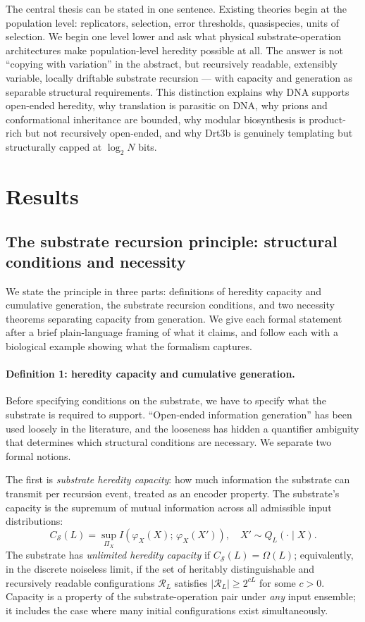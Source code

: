 \documentclass[aps,prx,reprint,amsmath,amssymb,floatfix,superscriptaddress,nofootinbib]{revtex4-2}
\theoremstyle{plain-thm}
\theoremstyle{definition-thm}
\newcommand{\Csub}{C_{\mathcal{S}}}
\newcommand{\descX}{\varphi_X}
\newcommand{\Reach}{\mathcal{R}}
\begin{document}
The central thesis can be stated in one sentence. Existing theories begin at the population level: replicators, selection, error thresholds, quasispecies, units of selection. We begin one level lower and ask what physical substrate-operation architectures make population-level heredity possible at all. The answer is not ``copying with variation'' in the abstract, but recursively readable, extensibly variable, locally driftable substrate recursion --- with capacity and generation as separable structural requirements. This distinction explains why DNA supports open-ended heredity, why translation is parasitic on DNA, why prions and conformational inheritance are bounded, why modular biosynthesis is product-rich but not recursively open-ended, and why Drt3b is genuinely templating but structurally capped at $\log_2 N$ bits.


\section{Results}

\subsection{The substrate recursion principle: structural conditions and necessity}

We state the principle in three parts: definitions of heredity capacity and cumulative generation, the substrate recursion conditions, and two necessity theorems separating capacity from generation. We give each formal statement after a brief plain-language framing of what it claims, and follow each with a biological example showing what the formalism captures.

\paragraph{Definition 1: heredity capacity and cumulative generation.}

Before specifying conditions on the substrate, we have to specify what the substrate is required to support. ``Open-ended information generation'' has been used loosely in the literature, and the looseness has hidden a quantifier ambiguity that determines which structural conditions are necessary. We separate two formal notions.

The first is \emph{substrate heredity capacity}: how much information the substrate can transmit per recursion event, treated as an encoder property. The substrate's capacity is the supremum of mutual information across all admissible input distributions:
\begin{equation}
\Csub(L) = \sup_{\Pi_X} I\!\left(\descX(X);\, \descX(X')\right), \quad X' \sim Q_L(\cdot \mid X).
\label{eq:capacity}
\end{equation}
The substrate has \emph{unlimited heredity capacity} if $\Csub(L) = \Omega(L)$; equivalently, in the discrete noiseless limit, if the set of heritably distinguishable and recursively readable configurations $\Reach_L$ satisfies $|\Reach_L| \ge 2^{cL}$ for some $c > 0$. Capacity is a property of the substrate-operation pair under \emph{any} input ensemble; it includes the case where many initial configurations exist simultaneously.
\end{document}
